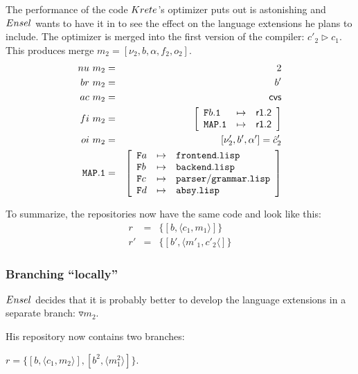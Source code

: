 \documentclass[fleqn, 10pt, a4paper]{article}
\begin{document}
The performance of the code $\mathnormal{Krete}$'s optimizer puts out is
astonishing and $\mathnormal{Ensel}$ wants to have it in to see the effect
on the language extensions he plans to include. The optimizer is
merged into the first version of the compiler: $c'_2 \rhd c_1$. This
produces merge $m_2=[\nu_2, b, \alpha, f_2, o_2]$.
\begin{eqnarray*}
\mathnormal{nu}\ m_2 &=& 2 \\
\mathnormal{br}\ m_2 &=& b' \\
\mathnormal{ac}\ m_2 &=& \mathsf{cvs} \\
\mathnormal{fi}\ m_2 &=& \left[
\begin{array}{lcl}
\mathtt{F}b\mathtt{.1} & \mapsto & \mathsf{r1.2} \\
\mathtt{MAP.1}         & \mapsto & \mathsf{r1.2} \\
\end{array}\right] \\
\mathnormal{oi}\ m_2 &=& [\nu'_2, b', \alpha'] = \hat c'_2 \\
\mathtt{MAP.1} &=& \left[
\begin{array}{lcl}
\mathtt{F}a &\mapsto& \mathtt{frontend.lisp} \\
\mathtt{F}b &\mapsto& \mathtt{backend.lisp} \\
\mathtt{F}c &\mapsto& \mathtt{parser/grammar.lisp} \\
\mathtt{F}d &\mapsto& \mathtt{absy.lisp} \\
\end{array}\right]
\end{eqnarray*}

\medskip
To summarize, the repositories now have the same code and look like this:
\begin{eqnarray*}
r  &=& \{[b, \langle c_1, m_1\rangle]\} \\
r' &=& \{[b', \langle m'_1, c'_2\langle]\}
\end{eqnarray*}

\subsubsection{Branching ``locally''}

$\mathnormal{Ensel}$ decides that it is probably better to develop
the language extensions in a separate branch: $\triangledown m_2$.

His repository now contains two branches:

$r=\{[b, \langle c_1, m_2\rangle], [b^2, \langle m_1^2 \rangle]\}$.
\end{document}
